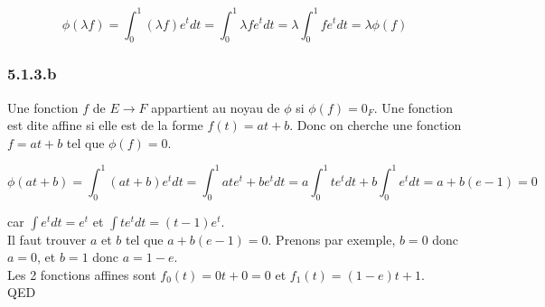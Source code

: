 \documentclass[]{book}
\theoremstyle{definition}
\begin{document}
$$
\phi(\lambda f) = \int_0^1{(\lambda f)e^t dt} = \int_0^1{ \lambda f e^t dt} =  \lambda \int_0^1{f e^t dt} = \lambda \phi(f)
$$

\subsubsection*{5.1.3.b}
Une fonction $f$ de $E \to F$ appartient au noyau de $\phi$ si $\phi(f) = 0_F$. Une fonction est dite affine si elle est de la forme $f(t) = at + b$. Donc on cherche une fonction $f=at+b$ tel que $\phi(f)=0$.

$$
\phi(at+b) = \int_0^1{(at+b)e^t dt} = \int_0^1{at e^t + b e^t dt} = a\int_0^1{t e^t dt} + b\int_0^1{e^t dt} = a + b(e-1) = 0
$$

car $\int{e^t dt} = e^t$ et $\int{t e^t dt} = (t-1)e^t$.\\

Il faut trouver $a$ et $b$ tel que $a+b(e-1) = 0$. Prenons par exemple, $b=0$ donc $a=0$, et $b=1$ donc $a = 1-e$.\\
Les 2 fonctions affines sont $f_0(t) = 0t+0 = 0$ et $f_1(t) = (1-e)t + 1$.\\





QED
\end{document}
